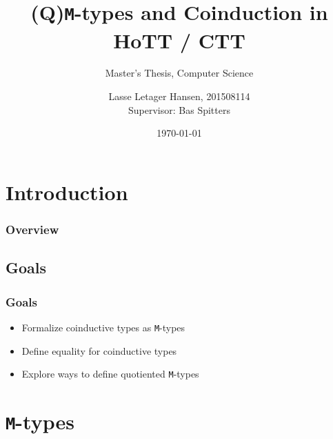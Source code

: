 \documentclass[xelatex,mathserif,serif,notheorems]{beamer} %
\title{(Q)\texttt{M}-types and Coinduction in HoTT / CTT}
\subtitle{Master's Thesis, Computer Science}
\author{\large Lasse Letager Hansen, 201508114\\[1ex]{\small Supervisor: Bas Spitters}}
\institute{Aarhus University}
\date{\today}
\theoremstyle{plain} %
\theoremstyle{definition}
\theoremstyle{remark}
\begin{document}
\frame{\titlepage}

\section{Introduction}

\begin{frame}
  \frametitle{Overview}
  \tableofcontents[subsubsectionstyle=hide]
\end{frame}

\subsection{Goals}
\begin{frame}
  \frametitle{Goals}
  \begin{itemize}
  \item Formalize coinductive types as \texttt{M}-types
  \item Define equality for coinductive types %
  \item Explore ways to define quotiented \texttt{M}-types
  \end{itemize}
\end{frame}

\section{\texttt{M}-types}
\end{document}
